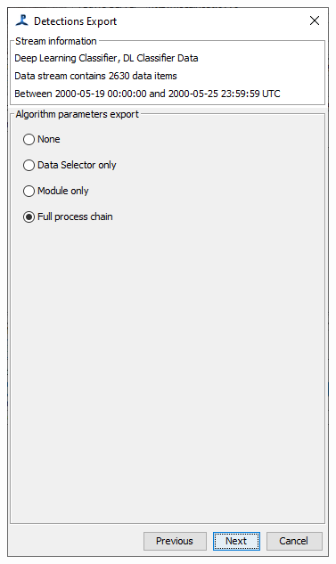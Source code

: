 \documentclass[
]{article}
\begin{document}
\begin{figure}
\begin{minipage}{0.33\linewidth}
{\includegraphics[width=0.99\linewidth,height=\textheight,keepaspectratio]{./media/export4.png}

}


\end{minipage}%
%
\begin{minipage}{0.33\linewidth}

\centering{

}
\end{minipage}
\end{figure}
\end{document}
